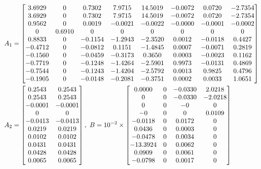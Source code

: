 {\scriptsize 
\begin{align*}
& A_1  = \left[\begin{matrix}
3.6929   &      0  &  0.7302  &  7.9715 &  14.5019 &   -0.0072 &
0.0720 &   -2.7354\\
    3.6929   &      0  &  0.7302  &  7.9715 &  14.5019 &  -0.0072  &  0.0720  & -2.7354\\
    0.9562    &     0  &  0.0019 &  -0.0021 &  -0.0022 &   -0.0000 &  -0.0001 &  -0.0002\\
         0 &   0.6910    &     0    &     0  &       0     &    0   &      0    &     0\\
    0.8833     &    0  & -0.1154 &  -1.2943 &  -2.3520  &  0.0012 &  -0.0118  &  0.4427\\
   -0.4712    &     0 &  -0.0812 &    0.1151  & -1.4845  &  0.0007 &  -0.0071  &  0.2819\\
   -0.1560     &    0 &  -0.0459 &  -0.3173  &  0.3650  &  0.0003  & -0.0023  &  0.1162\\
   -0.7719   &      0 &  -0.1248  & -1.4264 &  -2.5901  &  0.9973 &  -0.0131  &  0.4869\\
   -0.7544  &       0  & -0.1243 &  -1.4204 &  -2.5792  &  0.0013 &   0.9825 &   0.4796\\
   -0.1905   &      0  & -0.0148  & -0.2081 &  -0.3751  &  0.0002  &  0.0033  &  1.0651
\end{matrix}\right]\\
& A_2 = \left[\begin{matrix}
0.2543  &  0.2543\\
    0.2543  &  0.2543\\
   -0.0001 &  -0.0001\\
         0 &        0\\
   -0.0413 &  -0.0413\\
    0.0219  &  0.0219\\
    0.0102 &   0.0102\\
    0.0431 &   0.0431\\
    0.0428 &   0.0428\\
    0.0065 &   0.0065\\
\end{matrix}\right],
~B = 10^{-2}\times\left[\begin{matrix}
 0.0000    &     0  & -0.0330 &   2.0218\\
    0   &      0  & -0.0330 &  -2.0218\\
    0  &       0 &   -0  &  0\\
   -0  &       0  &  0 &   0.0109\\
   -0.0118 &        0  &  0.0172  &  0 \\
    0.0436  &       0 &   0.0003 &  0 \\
   -0.0478   &      0  &  0.0034 &   0 \\
  -13.3924 &        0 &   0.0062 &   0 \\
    0.0909     &    0  &  0.0061 &  0\\
   -0.0798  &       0 &   0.0017  &  0\\
\end{matrix}\right]
\end{align*}}
\normalsize

